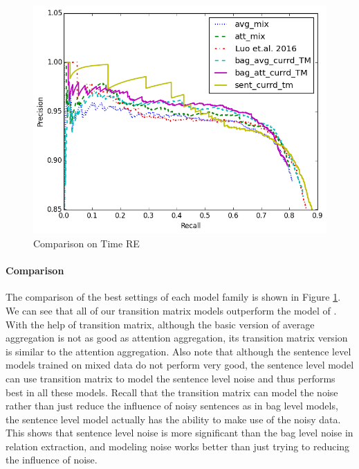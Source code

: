 \begin{figure}[htbp]
\begin{center}
\includegraphics[width=0.9\linewidth]{figures/best_cmp_exp_overall.png}
\caption{Comparison on Time RE}
\label{fig: cmp_luo}
\end{center}
\end{figure}

\paragraph{Comparison}
The comparison of the best settings of each model family is shown in Figure \ref{fig: cmp_luo}. We can see that all of our transition matrix models outperform the model of \cite{luo2016temporal}. With the help of transition matrix, although the basic version of average aggregation is not as good as attention aggregation, its transition matrix version is similar to the attention aggregation. Also note that although the sentence level models trained on mixed data do not perform very good, the sentence level model can use transition matrix to model the sentence level noise and thus performs best in all these models. Recall that the transition matrix can model the noise rather than just reduce the influence of noisy sentences as in bag level models, the sentence level model actually has the ability to make use of the noisy data. This shows that sentence level noise is more significant than the bag level noise in relation extraction, and modeling noise works better than just trying to reducing the influence of noise.


